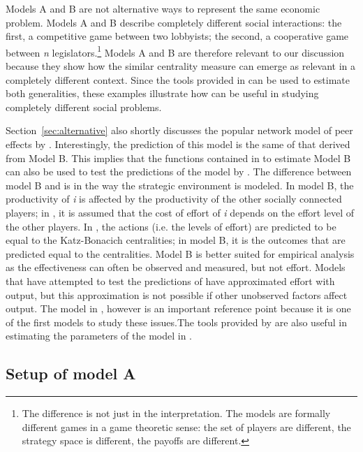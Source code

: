 \documentclass[nojss]{jss}
\begin{document}
Models A and B are not alternative ways to represent the same economic problem. Models A and B describe completely different social interactions: the first, a competitive game between two lobbyists; the second, a cooperative game between \textit{n} legislators.\footnote{The difference is not just in the interpretation. The models are formally different games in a game theoretic sense: the set of players are different, the strategy space is different, the payoffs are different.} Models A and B are therefore relevant to our discussion because they show how the similar centrality measure can emerge as relevant in a completely different context. Since the tools provided in  can be used to estimate both generalities, these examples illustrate how  can be useful in studying completely different social problems.

Section~\ref{sec:alternative} also shortly discusses the popular network model of peer effects by \cite{Ballester+Armengol+Zenou:2006}. Interestingly, the prediction of this model is the same of that derived from Model B. This implies that the functions contained in  to estimate Model B can also be used to test the predictions of the model by \cite{Ballester+Armengol+Zenou:2006}. The difference between model B and \cite{Ballester+Armengol+Zenou:2006} is in the way the strategic environment is modeled. In model B, the productivity of \textit{i} is affected by the productivity of the other socially connected players; in \cite{Ballester+Armengol+Zenou:2006}, it is assumed that the cost of effort of \textit{i} depends on the effort level of the other players. In \cite{Ballester+Armengol+Zenou:2006}, the actions (i.e. the levels of effort) are predicted to be equal to the Katz-Bonacich centralities; in model B, it is the outcomes that are predicted equal to the centralities. Model B is better suited for empirical analysis as the effectiveness can often be observed and measured, but not effort. Models that have attempted to test the predictions of \cite{Ballester+Armengol+Zenou:2006} have approximated effort with output, but this approximation is not possible if other unobserved factors affect output. The model in \cite{Ballester+Armengol+Zenou:2006}, however is an important reference point because it is one of the first models to study these issues.The tools provided by  are also useful in estimating the parameters of the model in \cite{Ballester+Armengol+Zenou:2006}.

\subsection{Setup of model A}\label{sec:modelA}
\end{document}
